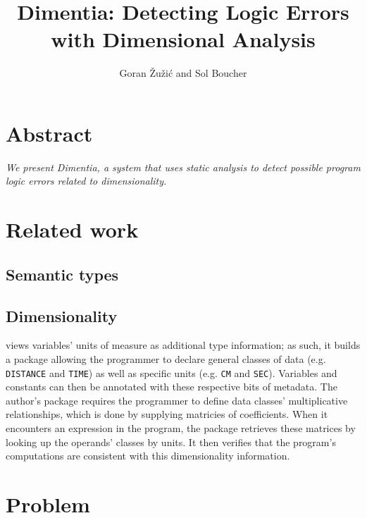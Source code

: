 \documentclass[12pt]{article}
\title{\Large Dimentia: Detecting Logic Errors with Dimensional Analysis}
\author{Goran \v{Z}u\v{z}i\'c and Sol Boucher}
\begin{document}
\maketitle

\section*{Abstract}

\textit{We present \textnormal{Dimentia}, a system that uses static analysis to detect possible program logic errors related to dimensionality.}

\section{Related work}

\subsection{Semantic types}

\subsection{Dimensionality}

\cite{hilfinger1988ada} views variables' units of measure as additional type information; as such, it builds a package allowing the programmer to declare general classes of data (e.g. \texttt{DISTANCE} and \texttt{TIME}) as well as specific units (e.g. \texttt{CM} and \texttt{SEC}).
Variables and constants can then be annotated with these respective bits of metadata.
The author's package requires the programmer to define data classes' multiplicative relationships, which is done by supplying matricies of coefficients.
When it encounters an expression in the program, the package retrieves these matrices by looking up the operands' classes by units.
It then verifies that the program's computations are consistent with this dimensionality information.

\section{Problem}
\end{document}
